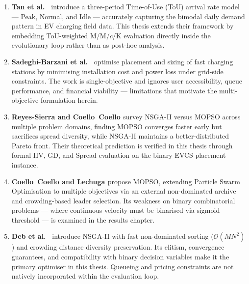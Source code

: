 \begin{enumerate}
\item \textbf{Tan et al.\ \cite{tan_tou_2016}} introduce a three-period
Time-of-Use (ToU) arrival rate model --- Peak, Normal, and Idle --- accurately
capturing the bimodal daily demand pattern in EV charging field data. This
thesis extends their framework by embedding ToU-weighted M/M/$c$/K evaluation
directly inside the evolutionary loop rather than as post-hoc analysis.

\item \textbf{Sadeghi-Barzani et al.\ \cite{sadeghi_fast_2014}} optimise
placement and sizing of fast charging stations by minimising installation cost
and power loss under grid-side constraints. The work is single-objective and
ignores user accessibility, queue performance, and financial viability ---
limitations that motivate the multi-objective formulation herein.

\item \textbf{Reyes-Sierra and Coello~Coello \cite{reyes_sierra_2006}} survey
NSGA-II versus MOPSO across multiple problem domains, finding MOPSO converges
faster early but sacrifices spread diversity, while NSGA-II maintains a
better-distributed Pareto front. Their theoretical prediction is verified in
this thesis through formal HV, GD, and Spread evaluation on the binary EVCS
placement instance.

\item \textbf{Coello~Coello and Lechuga \cite{coello_mopso_2002}} propose
MOPSO, extending Particle Swarm Optimisation to multiple objectives via an
external non-dominated archive and crowding-based leader selection. Its
weakness on binary combinatorial problems --- where continuous velocity must
be binarised via sigmoid threshold --- is examined in the results chapter.

\item \textbf{Deb et al.\ \cite{deb_nsga2_2002}} introduce NSGA-II with fast
non-dominated sorting ($\mathcal{O}(MN^2)$) and crowding distance diversity
preservation. Its elitism, convergence guarantees, and compatibility with
binary decision variables make it the primary optimiser in this thesis.
Queueing and pricing constraints are not natively incorporated within the
evaluation loop.

\end{enumerate}

